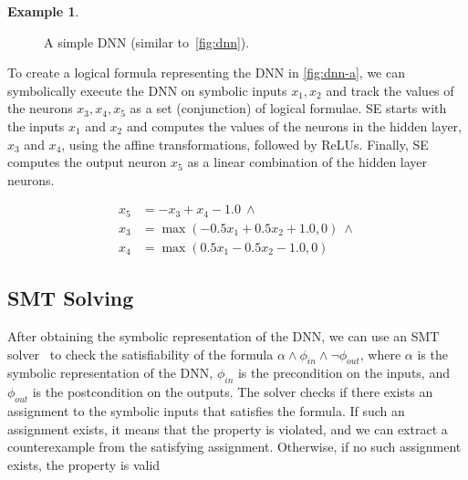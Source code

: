 \documentclass[oneside,11pt,dvipsnames]{book}
\numberwithin{equation}{section}
\theoremstyle{definition}
\newtheorem{example}{Example}[section]
\theoremstyle{remark}
\begin{document}
\begin{example}\label{ex:se-dnn}
\begin{figure}
\centering
\mydnn
\caption{\label{fig:dnn-a}A simple DNN (similar to~\autoref{fig:dnn}).}
\end{figure}    

To create a logical formula representing the DNN in \autoref{fig:dnn-a}, we can symbolically execute the DNN on symbolic inputs $x_1,x_2$ and track the values of the neurons $x_3, x_4, x_5$ as a set (conjunction) of logical formulae.  SE starts with the inputs $x_1$ and $x_2$ and computes the values of the neurons in the hidden layer, $x_3$ and $x_4$, using the affine transformations, followed by ReLUs. Finally, SE computes the output neuron $x_5$ as a linear combination of the hidden layer neurons.

\begin{equation}\label{eq:se-dnn}
    \begin{split}
x_5 &= -x_3 + x_4 - 1.0 ~\land \\
x_3 &= \max(-0.5x_1 + 0.5x_2 + 1.0, 0) ~\land \\
x_4 &= \max(0.5x_1 - 0.5x_2 - 1.0, 0)
    \end{split}
\end{equation}

\end{example}

\subsection{SMT Solving}\label{sec:smt}
After obtaining the symbolic representation of the DNN, we can use an SMT solver~\cite{barrett2010smt} to check the satisfiability of the formula $\alpha \land \phi_{in} \land \neg \phi_{out} $, where $\alpha$ is the symbolic representation of the DNN, $\phi_{in}$ is the precondition on the inputs, and $\phi_{out}$ is the postcondition on the outputs. The solver checks if there exists an assignment to the symbolic inputs that satisfies the formula. If such an assignment exists, it means that the property is violated, and we can extract a counterexample from the satisfying assignment. Otherwise, if no such assignment exists, the property is valid
\end{document}
